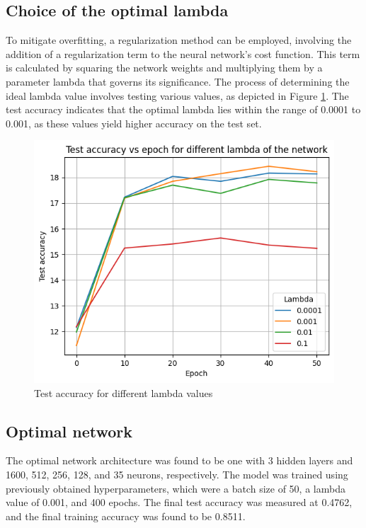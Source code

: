 \documentclass{class}
\begin{document}
\subsection{Choice of the optimal lambda}

To mitigate overfitting, a regularization method can be employed, involving the addition of a regularization term to the neural network's cost function.
This term is calculated by squaring the network weights and multiplying them by a parameter lambda that governs its significance.
The process of determining the ideal lambda value involves testing various values, as depicted in Figure \ref{fig-4}.
The test accuracy indicates that the optimal lambda lies within the range of 0.0001 to 0.001, as these values yield higher accuracy on the test set.
\begin{figure}[H]
    \centering
    \includegraphics[width=.7\columnwidth]{images/lamda.png}
    \caption{Test accuracy for different lambda values}
    \label{fig-4}
\end{figure}

\subsection{Optimal network}
The optimal network architecture was found to be one with 3 hidden layers and 1600, 512, 256, 128, and 35 neurons, respectively.
The model was trained using previously obtained hyperparameters, which were a batch size of 50, a lambda value of 0.001, and 400 epochs.
The final test accuracy was measured at 0.4762, and the final training accuracy was found to be 0.8511.
\end{document}
